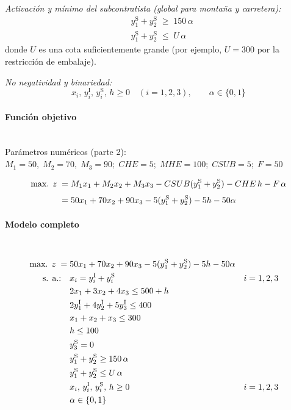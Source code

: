 \textit{Activación y mínimo del subcontratista (global para montaña y carretera):}
\begin{align}
& y_1^{\mathrm{S}} + y_2^{\mathrm{S}} \;\geq\; 150\, \alpha \label{minimo-sub-alpha}\\
& y_1^{\mathrm{S}} + y_2^{\mathrm{S}} \;\leq\; U\, \alpha \label{cota-superior-sub-alpha}
\end{align}
donde $U$ es una cota suficientemente grande (por ejemplo, $U=300$ por la restricción de embalaje).

\textit{No negatividad y binariedad:}
\begin{equation}
x_i,\, y_i^{\mathrm{I}},\, y_i^{\mathrm{S}},\, h \geq 0 \quad (i=1,2,3),
\qquad \alpha \in \{0,1\}
\end{equation}


\paragraph{Función objetivo}\mbox{}\\
Parámetros numéricos (parte 2):  
\(
M_1=50,\; M_2=70,\; M_3=90;\;
CHE=5;\; MHE=100;\; CSUB=5;\; F=50
\)

\begin{align}
\mbox{max. } z \;=\;& 
M_1x_1 + M_2x_2 + M_3x_3 
- CSUB(y_1^{\mathrm{S}} + y_2^{\mathrm{S}})
- CHE\,h 
- F\,\alpha \notag\\[1mm]
=\;& 
50x_1 + 70x_2 + 90x_3
- 5(y_1^{\mathrm{S}} + y_2^{\mathrm{S}})
- 5h - 50\alpha
\end{align}


\paragraph{Modelo completo}\mbox{}\\[-1mm]
\begin{align}
\mbox{max. } z \;=\;& 
50x_1 + 70x_2 + 90x_3
- 5(y_1^{\mathrm{S}} + y_2^{\mathrm{S}})
- 5h - 50\alpha \notag\\
\mbox{s. a.:}\quad
& x_i = y_i^{\mathrm{I}} + y_i^{\mathrm{S}} && i = 1,2,3 \notag\\
& 2x_1 + 3x_2 + 4x_3 \leq 500 + h \notag\\
& 2y_1^{\mathrm{I}} + 4y_2^{\mathrm{I}} + 5y_3^{\mathrm{I}} \leq 400 \notag\\
& x_1 + x_2 + x_3 \leq 300 \notag\\
& h \leq 100 \notag\\
& y_3^{\mathrm{S}} = 0 \notag\\
& y_1^{\mathrm{S}} + y_2^{\mathrm{S}} \geq 150\,\alpha \notag\\
& y_1^{\mathrm{S}} + y_2^{\mathrm{S}} \leq U\,\alpha \notag\\
& x_i,\, y_i^{\mathrm{I}},\, y_i^{\mathrm{S}},\, h \geq 0 && i=1,2,3 \notag\\
& \alpha \in \{0,1\} \notag
\end{align}




